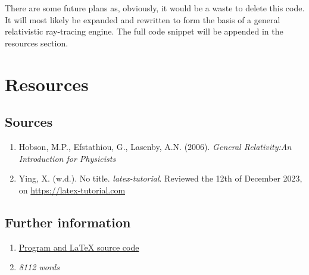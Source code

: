\documentclass{article}
\begin{document}
There are some future plans as, obviously, it would be a waste to delete this code. It will most likely be expanded and rewritten to form the basis of a general relativistic ray-tracing engine. The full code snippet will be appended in the resources section.

\newpage

\section{Resources}

\subsection{Sources}

\begin{enumerate}
  \item Hobson, M.P., Efstathiou, G., Lasenby, A.N. (2006). \textit{General Relativity:An Introduction for Physicists}
  \item Ying, X. (w.d.). No title. \textit{latex-tutorial}. Reviewed the 12th of December 2023, on \href{https://latex-tutorial.com}{https://latex-tutorial.com}
\end{enumerate}

\subsection{Further information}

\begin{enumerate}
\item \href{https://github.com/programmingyeah/GR-simulator}{Program and LaTeX source code}

\item \textit{8112 words}
\end{enumerate}
\end{document}
